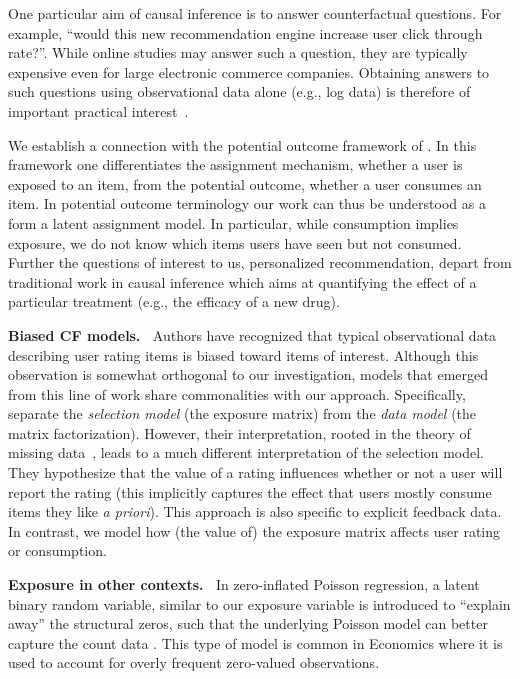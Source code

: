 \documentclass{sig-alternate-arxiv}
\begin{document}
One particular aim of causal inference is to answer counterfactual
questions. For example, ``would this new recommendation engine increase
user click through rate?''.  While online studies may answer such a question, they are
typically expensive even for large electronic commerce companies.
Obtaining answers to such questions using observational data alone (e.g.,
log data) is therefore of important practical
interest~\cite{bottou2015counterfactual,li2010contextual,swaminathan2015counterfactual}.

We establish a connection with the potential outcome framework of
\citet{rubin1974ece}. In this framework one differentiates the assignment mechanism,
whether a user is exposed to an item, from the potential outcome, whether a
user consumes an item. In potential outcome terminology our work can thus
be understood as a form a latent assignment model. In particular, while
consumption implies exposure, we do not know which items users have 
seen but not consumed. Further the questions of interest to us,
personalized recommendation, depart from traditional work in causal
inference which aims at quantifying the effect of a particular treatment
(e.g., the efficacy of a new drug). 

{\vspace{0.1in}\noindent \textbf{{Biased CF models.} \,}} Authors have recognized that typical
observational data describing user rating items is biased toward items of
interest. Although this observation is somewhat orthogonal to our
investigation, models that emerged from this line of work share
commonalities with our approach.  Specifically, \citet{DBLP:conf/uai/MarlinZRS07,ling12response}
separate the \emph{selection model} (the exposure matrix) from the
\emph{data model} (the matrix factorization). However, their
interpretation, rooted in the theory of missing data~\cite{little1986statistical}, leads to a
much different interpretation of the selection model. They hypothesize
that the value of a rating influences whether or not a user will report
the rating (this implicitly captures the effect that users mostly consume
items they like \emph{a priori}). This approach is also specific to
explicit feedback data. In contrast, we model how (the value of) the
exposure matrix affects user rating or consumption. 

{\vspace{0.1in}\noindent \textbf{{Exposure in other contexts.} \,}} In zero-inflated Poisson regression, a
latent binary random variable, similar to our exposure variable is introduced to ``explain away'' the structural zeros, such that the
underlying Poisson model can better capture the count data
\cite{lambert1992zero}. This type of model is common in Economics where it is used
to account for overly frequent zero-valued observations.  
\end{document}
